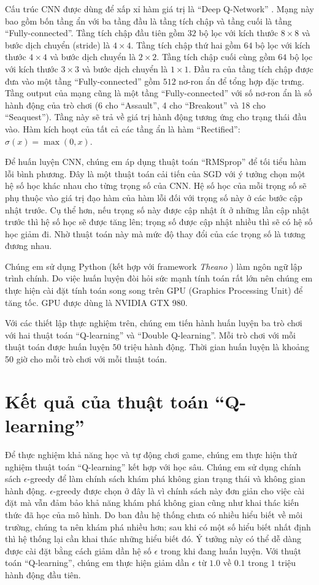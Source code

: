 	Cấu trúc CNN được dùng để xấp xỉ hàm giá trị là ``Deep Q-Network'' \cite{mnihdqn2015}.
	Mạng này bao gồm bốn tầng ẩn với ba tầng đầu là tầng tích chập và tầng cuối là tầng ``Fully-connected''.
	Tầng tích chập đầu tiên gồm $32$ bộ lọc với kích thước $8\times8$ và bước dịch chuyển (stride) là $4\times4$.
	Tầng tích chập thứ hai gồm $64$ bộ lọc với kích thước $4\times4$ và bước dịch chuyển là $2\times2$.
	Tầng tích chập cuối cùng gồm $64$ bộ lọc với kích thước $3\times3$ và bước dịch chuyển là $1\times1$.
	Đầu ra của tầng tích chập được đưa vào một tầng ``Fully-connected'' gồm $512$ nơ-ron ẩn để tổng hợp đặc trưng.
	Tầng output của mạng cũng là một tầng ``Fully-connected'' với số nơ-ron ẩn là số hành động của trò chơi (6 cho ``Assault'', 4 cho ``Breakout'' và 18 cho ``Seaquest'').
	Tầng này sẽ trả về giá trị hành động tương ứng cho trạng thái đầu vào.
	Hàm kích hoạt của tất cả các tầng ẩn là hàm ``Rectified'': $\sigma(x) = \max(0, x)$.
	
	Để huấn luyện CNN, chúng em áp dụng thuật toán ``RMSprop'' \cite{tieleman2012lecture} để tối tiểu hàm lỗi bình phương.
	Đây là một thuật toán cải tiến của SGD với ý tưởng chọn một hệ số học khác nhau cho từng trọng số của CNN.
	Hệ số học của mỗi trọng số sẽ phụ thuộc vào giá trị đạo hàm của hàm lỗi đối với trọng số này ở các bước cập nhật trước.
	Cụ thể hơn, nếu trọng số này được cập nhật ít ở những lần cập nhật trước thì hệ số học sẽ được tăng lên; trọng số được cập nhật nhiều thì sẽ có hệ số học giảm đi.
	Nhờ thuật toán này mà mức độ thay đổi của các trọng số là tương đương nhau.
	
	Chúng em sử dụng Python (kết hợp với framework \textit{Theano} \cite{2016arXiv160502688short}) làm ngôn ngữ lập trình chính.
	Do việc huấn luyện đòi hỏi sức mạnh tính toán rất lớn nên chúng em thực hiện cài đặt tính toán song song trên GPU (Graphics Processing Unit) để tăng tốc.
	GPU được dùng là NVIDIA GTX 980.
	
	Với các thiết lập thực nghiệm trên, chúng em tiến hành huấn luyện ba trò chơi với hai thuật toán ``Q-learning'' và ``Double Q-learning''.
	Mỗi trò chơi với mỗi thuật toán được huấn luyện $50$ triệu hành động.
	Thời gian huấn luyện là khoảng 50 giờ cho mỗi trò chơi với mỗi thuật toán.
	
\section{Kết quả của thuật toán ``Q-learning''}
	Để thực nghiệm khả năng học và tự động chơi game, chúng em thực hiện thử nghiệm thuật toán ``Q-learning'' kết hợp với học sâu.
	Chúng em sử dụng chính sách $\epsilon$-greedy để làm chính sách khám phá không gian trạng thái và không gian hành động.
	$\epsilon$-greedy được chọn ở đây là vì chính sách này đơn giản cho việc cài đặt mà vẫn đảm bảo khả năng khám phá không gian cũng như khai thác kiến thức đã học của mô hình.
	Do ban đầu hệ thống chưa có nhiều hiểu biết về môi trường, chúng ta nên khám phá nhiều hơn; sau khi có một số hiểu biết nhất định thì hệ thống lại cần khai thác những hiểu biết đó.
	Ý tưởng này có thể dễ dàng được cài đặt bằng cách giảm dần hệ số $\epsilon$ trong khi đang huấn luyện.
	Với thuật toán ``Q-learning'', chúng em thực hiện giảm dần $\epsilon$ từ $1.0$ về $0.1$ trong $1$ triệu hành động đầu tiên.
	
